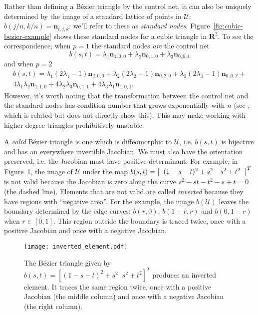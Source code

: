 \documentclass[oneside, reqno]{amsart}
\theoremstyle{definition}
\newcommand{\reals}{\mathbf{R}}
\newcommand{\utri}{\mathcal{U}}
\begin{document}
\noindent Rather than defining a B\'{e}zier triangle by the control net, it can
also be uniquely determined by the image of a standard lattice of
points in \(\utri\): \(b\left(j/n, k/n\right) = \bm{n}_{i, j, k}\);
we'll refer to these as \emph{standard nodes}.
Figure~\ref{fig:cubic-bezier-example} shows these standard nodes for
a cubic triangle in \(\reals^2\). To see the correspondence,
when \(p = 1\) the standard nodes \emph{are} the control net
\begin{equation}
b(s, t) = \lambda_1 \bm{n}_{1, 0, 0} +
\lambda_2 \bm{n}_{0, 1, 0} + \lambda_3 \bm{n}_{0, 0, 1}
\end{equation}
and when \(p = 2\)
\begin{multline}
b(s, t) = \lambda_1\left(2 \lambda_1 - 1\right) \bm{n}_{2, 0, 0} +
\lambda_2\left(2 \lambda_2 - 1\right) \bm{n}_{0, 2, 0} +
\lambda_3\left(2 \lambda_3 - 1\right) \bm{n}_{0, 0, 2} + \\
4 \lambda_1 \lambda_2 \bm{n}_{1, 1, 0} +
4 \lambda_2 \lambda_3 \bm{n}_{0, 1, 1} +
4 \lambda_3 \lambda_1 \bm{n}_{1, 0, 1}.
\end{multline}
However, it's worth noting that the transformation between
the control net and the standard nodes has condition
number that grows exponentially with \(n\) (see \cite{Farouki1991}, which
is related but does not directly show this).
This may make working with
higher degree triangles prohibitively unstable.

A \emph{valid} B\'{e}zier triangle is one which is
diffeomorphic to \(\utri\), i.e. \(b(s, t)\) is bijective and has
an everywhere invertible Jacobian. We must also have the orientation
preserved, i.e. the Jacobian must have positive determinant. For example, in
Figure~\ref{fig:inverted-element}, the image of \(\utri\) under
the map \(b(s, t) = \left[\begin{array}{c c} (1 - s - t)^2 + s^2 & s^2 + t^2
\end{array}\right]^T\) is not valid because the Jacobian is zero along
the curve \(s^2 - st - t^2 - s + t = 0\) (the dashed line). Elements that
are not valid are called \emph{inverted} because they have regions with
``negative area''. For the example, the image \(b\left(\utri\right)\)
leaves the boundary determined by the edge curves: \(b(r, 0)\),
\(b(1 - r, r)\) and \(b(0, 1 - r)\) when \(r \in \left[0, 1\right]\).
This region outside the boundary is traced twice, once with
a positive Jacobian and once with a negative Jacobian.
\begin{figure}
  \texttt{[image: inverted\_element.pdf]}
  \centering
  \captionsetup{width=.75\linewidth}
  \caption{The B\'{e}zier triangle given by \(b(s, t) = \left[
    (1 - s - t)^2 + s^2 \; \; s^2 + t^2 \right]^T\) produces an
    inverted element. It traces the same region twice, once with
    a positive Jacobian (the middle column) and once with a negative
    Jacobian (the right column).}
  \label{fig:inverted-element}
\end{figure}
\end{document}
